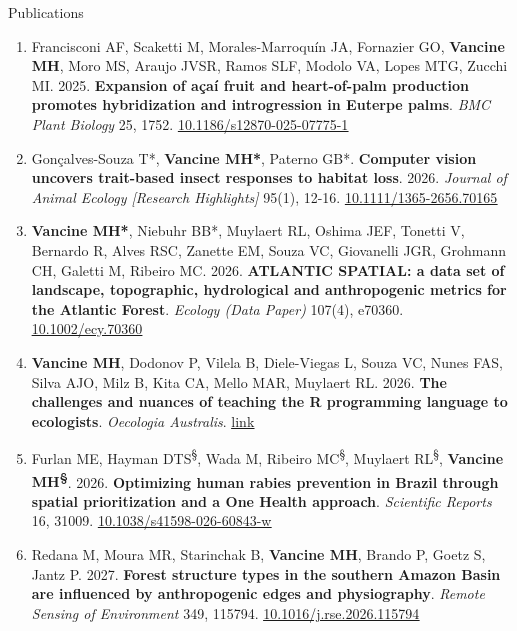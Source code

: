 \documentclass{resume}
\begin{document}
\begin{rSection}{Publications}
\begin{enumerate}
\item Francisconi AF, Scaketti M, Morales-Marroquín JA, Fornazier GO, \textbf{Vancine MH}, Moro MS, Araujo JVSR, Ramos SLF, Modolo VA, Lopes MTG, Zucchi MI. 2025. \textbf{Expansion of açaí fruit and heart-of-palm production promotes hybridization and introgression in Euterpe palms}. \textit{BMC Plant Biology} 25, 1752. \href{https://doi.org/10.1186/s12870-025-07775-1}{\underline{10.1186/s12870-025-07775-1}}

\item Gonçalves-Souza T*, \textbf{Vancine MH*}, Paterno GB*. \textbf{Computer vision uncovers trait-based insect responses to habitat loss}. 2026. \textit{Journal of Animal Ecology [Research Highlights]} 95(1), 12-16. \href{https://doi.org/10.1111/1365-2656.70165}{\underline{10.1111/1365-2656.70165}}

\item \textbf{Vancine MH*}, Niebuhr BB*, Muylaert RL, Oshima JEF, Tonetti V, Bernardo R, Alves RSC, Zanette EM, Souza VC, Giovanelli JGR, Grohmann CH, Galetti M, Ribeiro MC. 2026. \textbf{ATLANTIC SPATIAL: a data set of landscape, topographic, hydrological and anthropogenic metrics for the Atlantic Forest}. \textit{Ecology (Data Paper)} 107(4), e70360. \href{https://doi.org/10.1002/ecy.70360}{\underline{10.1002/ecy.70360}}

\item \textbf{Vancine MH}, Dodonov P, Vilela B, Diele-Viegas L, Souza VC, Nunes FAS, Silva AJO, Milz B, Kita CA, Mello MAR, Muylaert RL. 2026. \textbf{The challenges and nuances of teaching the R programming language to ecologists}. \textit{Oecologia Australis}. \href{https://revistas.ufrj.br/index.php/oa/article/view/64848}{\underline{link}}

\item Furlan ME, Hayman DTS\textsuperscript{\S}, Wada M, Ribeiro MC\textsuperscript{\S}, Muylaert RL\textsuperscript{\S}, \textbf{Vancine MH\textsuperscript{\S}}. 2026. \textbf{Optimizing human rabies prevention in Brazil through spatial prioritization and a One Health approach}. \textit{Scientific Reports} 16, 31009. \href{https://doi.org/10.1038/s41598-026-60843-w}{\underline{10.1038/s41598-026-60843-w}}

\item Redana M, Moura MR, Starinchak B, \textbf{Vancine MH}, Brando P, Goetz S, Jantz P. 2027. \textbf{Forest structure types in the southern Amazon Basin are influenced by anthropogenic edges and physiography}. \textit{Remote Sensing of Environment} 349, 115794. \href{https://doi.org/10.1016/j.rse.2026.115794}{\underline{10.1016/j.rse.2026.115794}}
\end{enumerate} 


\end{rSection}
\end{document}

